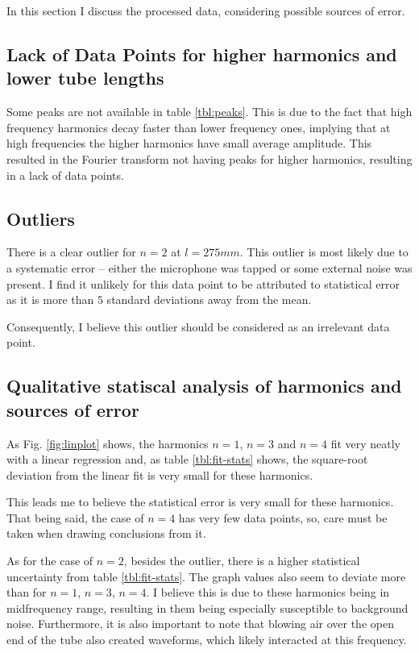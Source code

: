 \documentclass[conference]{IEEEtran}
\begin{document}
In this section I discuss the processed data, considering possible sources of
error.

\subsection{Lack of Data Points for higher harmonics and lower tube lengths}

Some peaks are not available in table \ref{tbl:peaks}. This is due to the fact
that high frequency harmonics decay faster than lower frequency ones, implying
that at high frequencies the higher harmonics have small average amplitude.
This resulted in the Fourier transform not having peaks for higher harmonics,
resulting in a lack of data points.

\subsection{Outliers}

There is a clear outlier for $n=2$ at $l = 275\si{mm}$. This outlier is most
likely due to a systematic error -- either the microphone was tapped or some
external noise was present. I find it unlikely for this data point to be
attributed to statistical error as it is more than $5$ standard deviations away
from the mean.

Consequently, I believe this outlier should be considered as an irrelevant data
point.

\subsection{Qualitative statiscal analysis of harmonics and sources of error}

As Fig. \ref{fig:linplot} shows, the harmonics $n=1$, $n=3$ and $n=4$ fit very
neatly with a linear regression and, as table \ref{tbl:fit-stats} shows, the
square-root deviation from the linear fit is very small for these harmonics.

This leads me to believe the statistical error is very small for these
harmonics. That being said, the case of $n=4$ has very few data points, so,
care must be taken when drawing conclusions from it.

As for the case of $n=2$, besides the outlier, there is a higher statistical
uncertainty from table \ref{tbl:fit-stats}. The graph values also seem to deviate
more than for $n=1$, $n=3$, $n=4$. I believe this is due to these harmonics
being in midfrequency range, resulting in them being especially susceptible to
background noise. Furthermore, it is also important to note that blowing air
over the open end of the tube also created waveforms, which likely interacted
at this frequency.
\end{document}
